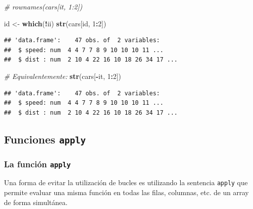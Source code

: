 \documentclass[
]{book}
\newenvironment{Shaded}{\begin{snugshade}}{\end{snugshade}}
\newcommand{\CommentTok}[1]{\textcolor[rgb]{0.56,0.35,0.01}{\textit{#1}}}
\newcommand{\DecValTok}[1]{\textcolor[rgb]{0.00,0.00,0.81}{#1}}
\newcommand{\FunctionTok}[1]{\textcolor[rgb]{0.13,0.29,0.53}{\textbf{#1}}}
\newcommand{\NormalTok}[1]{#1}
\newcommand{\OtherTok}[1]{\textcolor[rgb]{0.56,0.35,0.01}{#1}}
\newcommand{\SpecialCharTok}[1]{\textcolor[rgb]{0.81,0.36,0.00}{\textbf{#1}}}
\begin{document}
\begin{Shaded}
\begin{Highlighting}[]
\CommentTok{\# rownames(cars[it, 1:2])}

\NormalTok{id }\OtherTok{\textless{}{-}} \FunctionTok{which}\NormalTok{(}\SpecialCharTok{!}\NormalTok{ii)}
\FunctionTok{str}\NormalTok{(cars[id, }\DecValTok{1}\SpecialCharTok{:}\DecValTok{2}\NormalTok{])}
\end{Highlighting}
\end{Shaded}

\begin{verbatim}
## 'data.frame':    47 obs. of  2 variables:
##  $ speed: num  4 4 7 7 8 9 10 10 10 11 ...
##  $ dist : num  2 10 4 22 16 10 18 26 34 17 ...
\end{verbatim}

\begin{Shaded}
\begin{Highlighting}[]
\CommentTok{\# Equivalentemente:}
\FunctionTok{str}\NormalTok{(cars[}\SpecialCharTok{{-}}\NormalTok{it, }\DecValTok{1}\SpecialCharTok{:}\DecValTok{2}\NormalTok{])}
\end{Highlighting}
\end{Shaded}

\begin{verbatim}
## 'data.frame':    47 obs. of  2 variables:
##  $ speed: num  4 4 7 7 8 9 10 10 10 11 ...
##  $ dist : num  2 10 4 22 16 10 18 26 34 17 ...
\end{verbatim}

\begin{Shaded}
\end{Shaded}

\subsection{\texorpdfstring{Funciones \texttt{apply}}{Funciones apply}}\label{funciones-apply}

\subsubsection{\texorpdfstring{La función \texttt{apply}}{La función apply}}\label{la-funciuxf3n-apply}

Una forma de evitar la
utilización de bucles es utilizando la sentencia \texttt{apply} que permite
evaluar una misma función en todas las filas, columnas, etc. de un array
de forma simultánea.
\end{document}
